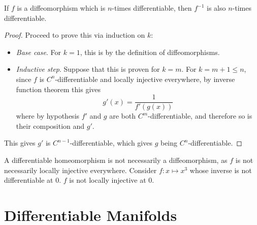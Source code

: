 \documentclass{article}
\begin{document}
\begin{proposition}
    If $f$ is a diffeomorphism which is $n$-times differentiable, then $f^{-1}$ is also $n$-times differentiable.
\end{proposition}

\begin{proof}
    Proceed to prove this via induction on $k$:
    \begin{itemize}
        \item \emph{Base case}. For $k = 1$, this is by the definition of diffeomorphisms.
        \item \emph{Inductive step}. Suppose that this is proven for $k = m$. For $k = m+1 \leq n$, since $f$ is $C^n$-differentiable and locally injective everywhere, by inverse function theorem this gives
        \[
            g'(x) = \frac{1}{f'(g(x))}
        \]
        where by hypothesis $f'$ and $g$ are both $C^m$-differentiable, and therefore so is their composition and $g'$.
    \end{itemize}
    This gives $g'$ is $C^{n-1}$-differentiable, which gives $g$ being $C^n$-differentiable.
\end{proof}

\begin{remark}
    A differentiable homeomorphism is not necessarily a diffeomorphism, as $f$ is not necessarily locally injective everywhere. Consider $f: x \mapsto x^3$ whose inverse is not differentiable at $0$. $f$ is not locally injective at 0.  
\end{remark}

\section{Differentiable Manifolds}
\end{document}
